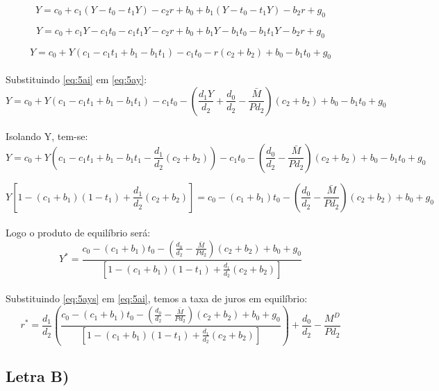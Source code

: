 \documentclass{article}
\begin{document}
\begin{equation}
Y = c_0 + c_1 (Y- t_0 - t_1 Y) - c_2 r + b_0 + b_1 (Y-t_0 - t_1 Y) - b_2 r + g_0
\end{equation}

\begin{equation}
Y = c_0 + c_1 Y- c_1 t_0 - c_1t_1 Y - c_2 r + b_0 + b_1 Y - b_1 t_0 - b_1 t_1 Y - b_2 r + g_0
\end{equation}

\begin{equation}\label{eq:5ay}
Y = c_0 +  Y(c_1-c_1t_1+b_1- b_1 t_1) - c_1 t_0 - r(c_2+b_2) + b_0 - b_1 t_0 + g_0
\end{equation}
\\
Substituindo \eqref{eq:5ai} em \eqref{eq:5ay}:
\begin{equation}
Y = c_0 +  Y(c_1-c_1t_1+b_1- b_1 t_1) - c_1 t_0 - (\frac{d_1Y}{d_2}+\frac{d_0}{d_2}-\frac{\bar{M}}{P d_2})(c_2+b_2) + b_0 - b_1 t_0 + g_0
\end{equation}
\\
Isolando Y, tem-se:
\begin{equation}
Y = c_0 +  Y(c_1-c_1t_1+b_1- b_1 t_1-\frac{d_1}{d_2}(c_2+b_2)) - c_1 t_0 - (\frac{d_0}{d_2}-\frac{\bar{M}}{P d_2})(c_2+b_2) + b_0 - b_1 t_0 + g_0
\end{equation}

\begin{equation}
Y[1-(c_1+b_1)(1-t_1)+\frac{d_1}{d_2}(c_2+b_2)]= c_0 - (c_1+b_1)t_0 - (\frac{d_0}{d_2}-\frac{\bar{M}}{P d_2})(c_2+b_2) + b_0+ g_0
\end{equation}
\\
Logo o produto de equilíbrio será:
\begin{equation}\label{eq:5ays}
Y^*=\frac{c_0 - (c_1+b_1)t_0 - (\frac{d_0}{d_2}-\frac{\bar{M}}{P d_2})(c_2+b_2) + b_0+ g_0}{[1-(c_1+b_1)(1-t_1)+\frac{d_1}{d_2}(c_2+b_2)]}
\end{equation}
\\
Substituindo \eqref{eq:5ays} em \eqref{eq:5ai}, temos a taxa de juros em equilíbrio:
\begin{equation}\label{eq:5ais}
r^*=\frac{d_1}{d_2}(\frac{c_0 - (c_1+b_1)t_0 - (\frac{d_0}{d_2}-\frac{\bar{M}}{P d_2})(c_2+b_2) + b_0+ g_0}{[1-(c_1+b_1)(1-t_1)+\frac{d_1}{d_2}(c_2+b_2)]})+\frac{d_0}{d_2}-\frac{M^D}{P d_2}
\end{equation}

\subsection*{Letra B)}
\end{document}
